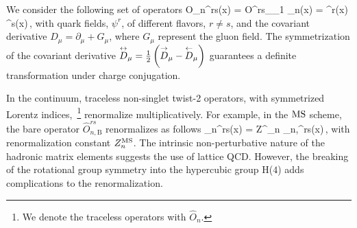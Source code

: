 We consider the following set of operators
\be
O_n^{rs}(x) = O^{rs}_{\mu_1 \cdots \mu_n}(x) =
\psibar^r(x)   \cdots {} \psi^s(x)\,,
\label{eq:t2}
\ee
with quark fields, $\psi^r$, of different flavors, $r \neq s$, and the
covariant derivative $D_\mu = \partial_\mu + G_\mu$, where $G_\mu$
represent the gluon field.
The symmetrization of the covariant derivative
$\overset\leftrightarrow{D}_\mu = \frac{1}{2}\left({\overset\rightarrow{D}_\mu} -
{\overset\leftarrow{D}_\mu}\right)$
guarantees a definite transformation under charge conjugation.

In the continuum,
traceless non-singlet twist-2 operators, with symmetrized
Lorentz indices,~\footnote{We denote the traceless operators with $\widehat{O}_n$.}
renormalize multiplicatively.
For example, in the $\text{MS}$ scheme, the bare operator $\widehat{O}_{n,{\text{B}}}^{rs}$
renormalizes as follows
\be
{}_n^{rs}(x) = Z^{\MS}_n _{n,{}}^{rs}(x)\,,
\ee
with renormalization constant $Z^{\text{MS}}_n$.
The intrinsic non-perturbative nature of the hadronic matrix elements
suggests the use of lattice QCD. However, the breaking
of the rotational group symmetry into the hypercubic group H($4$)
adds complications to the renormalization.

